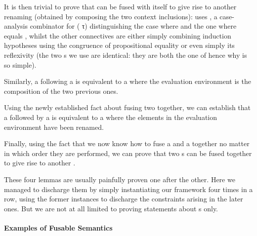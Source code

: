 
It is then trivial to prove that  can be fused with itself
to give rise to another renaming (obtained by composing the two context
inclusions):  uses \AF{[\_,\_]}, a case-analysis combinator
for   (  τ) distinguishing the case where 
  and the one where  equals , whilst the other connectives
are either simply combining induction hypotheses using the congruence of
propositional equality or even simply its reflexivity (the two s
we use are identical: they are both the one of  hence
why  is so simple).


Similarly, a  following a  is equivalent to
a  where the evaluation environment is the composition of
the two previous ones.


Using the newly established fact about fusing two  together,
we can establish that a  followed by a  is
equivalent to a  where the elements in the evaluation
environment have been renamed.


Finally, using the fact that we now know how to fuse a 
and a  together no matter in which order they are performed,
we can prove that two s can be fused together to give
rise to another .


These four lemmas are usually painfully proven one after the other. Here
we managed to discharge them by simply instantiating our framework four
times in a row, using the former instances to discharge the constraints
arising in the later ones. But we are not at all limited to proving
statements about s only.

\paragraph{Examples of Fusable Semantics}

